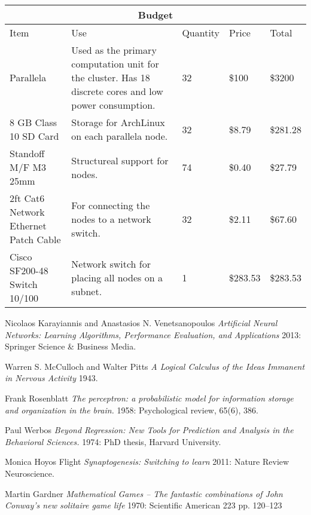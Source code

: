 \documentclass[letter]{article}
\begin{document}
\vspace{7mm}
\centering
\begin{tabular}{ |p{2cm}|p{6cm}|p{1.5cm}|p{1cm}| p{1.5cm}|
 }
 \hline
 \multicolumn{5}{|c|}{Budget} \\
 \hline
Item& Use& Quantity&Price & Total\\
 \hline
  Parallela & Used as the primary computation unit for the cluster.  Has 18 discrete cores and low power
  consumption.  & 32 & \$100  & \$3200\\
  \hline
  8 GB Class 10 SD Card & Storage for ArchLinux on each parallela node. &32 &\$8.79 &\$281.28 \\
    \hline
  Standoff M/F M3 25mm &Structureal support for nodes. &74 &\$0.40 &\$27.79 \\
    \hline
  2ft Cat6 Network Ethernet Patch Cable & For connecting the nodes to a network switch. &32 &\$2.11 &\$67.60 \\
   \hline
  Cisco SF200-48 Switch 10/100 & Network switch for placing all nodes on a subnet. &1 &\$283.53 &\$283.53 \\

 \hline
\end{tabular}
\begin{thebibliography}{1}
     Nicolaos Karayiannis and Anastasios N. Venetsanopoulos {\em
    Artificial Neural Networks: Learning Algorithms, Performance Evaluation, and Applications} 2013: Springer Science
    & Business Media.

     Warren S. McCulloch and Walter Pitts {\em A Logical Calculus of the Ideas Immanent in Nervous Activity} 1943.

     Frank Rosenblatt {\em The perceptron: a probabilistic model for information storage and organization in the brain.}
    1958: Psychological review, 65(6), 386.

     Paul Werbos {\em Beyond Regression: New Tools for Prediction and Analysis in the Behavioral Sciences.} 1974: PhD thesis,
    Harvard University.

     Monica Hoyos Flight {\em Synaptogenesis: Switching to learn} 2011: Nature Review Neuroscience.

     Martin Gardner {\em Mathematical Games – The fantastic combinations of John Conway's new solitaire game life} 1970:
     Scientific American 223 pp. 120–123

\end{thebibliography}
\end{document}
